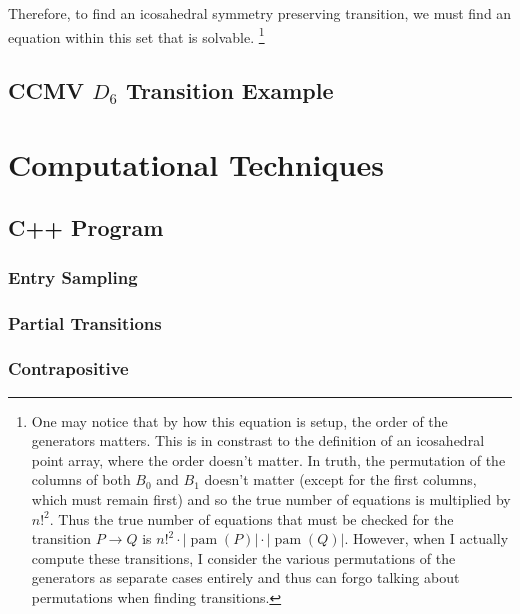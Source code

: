 \documentclass[a4paper,10pt]{article}
\let\oldfootnote\footnote
\renewcommand{\footnote}{\unskip\oldfootnote}
\theoremstyle{plain}
\theoremstyle{definition}
\theoremstyle{remark}
\newcommand\abs[1]{\left|#1\right|}
\DeclareMathOperator{\pam}{pam}
\begin{document}
Therefore, to find an icosahedral symmetry preserving transition, we must find an equation within this set that is solvable.
\footnote{
	One may notice that by how this equation is setup, the order of the generators matters.
	This is in constrast to the definition of an icosahedral point array, where the order doesn't matter.
	In truth, the permutation of the columns of both \( B_0 \) and \( B_1 \) doesn't matter (except for the first columns, which must remain first) and so the true number of equations is multiplied by \( n!^2 \).
	Thus the true number of equations that must be checked for the transition \( P \to Q \) is \( n!^2\cdot\abs{\pam(P)}\cdot\abs{\pam(Q)} \).
	However, when I actually compute these transitions, I consider the various permutations of the generators as separate cases entirely and thus can forgo talking about permutations when finding transitions.
	}

\subsection{CCMV \( D_6 \) Transition Example}


\section{Computational Techniques}


\subsection{C++ Program}
\subsubsection{Entry Sampling}
\subsubsection{Partial Transitions}
\subsubsection{Contrapositive}
\end{document}
